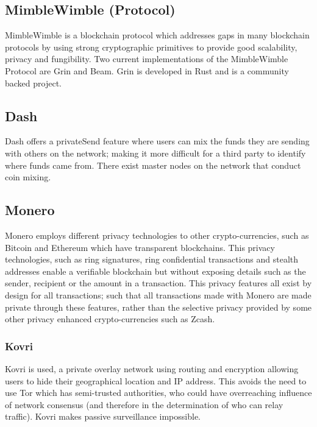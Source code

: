 \subsection{MimbleWimble (Protocol)}\label{background-mimblewimble}
MimbleWimble is a blockchain protocol which addresses gaps in many blockchain protocols by using strong cryptographic primitives to provide good scalability, privacy and fungibility. Two current implementations of the MimbleWimble Protocol are Grin and Beam. Grin is developed in Rust and is a community backed project. 

\subsection{Dash}
Dash offers a privateSend feature where users can mix the funds they are sending with others on the network; making it more difficult for a third party to identify where funds came from. There exist master nodes on the network that conduct coin mixing. 

\subsection{Monero}\label{background-monero}
Monero employs different privacy technologies to other crypto-currencies, such as Bitcoin and Ethereum which have transparent blockchains. This privacy technologies, such as ring signatures, ring confidential transactions and stealth addresses enable a verifiable blockchain but without exposing details such as the sender, recipient or the amount in a transaction. This privacy features all exist by design for all transactions; such that all transactions made with Monero are made private through these features, rather than the selective privacy provided by some other privacy enhanced crypto-currencies such as Zcash. 

\subsubsection{Kovri}
Kovri is used, a private overlay network using routing and encryption allowing users to hide their geographical location and IP address. This avoids the need to use Tor which has semi-trusted authorities, who could have overreaching influence of network consensus (and therefore in the determination of who can relay traffic). Kovri makes passive surveillance impossible. 

